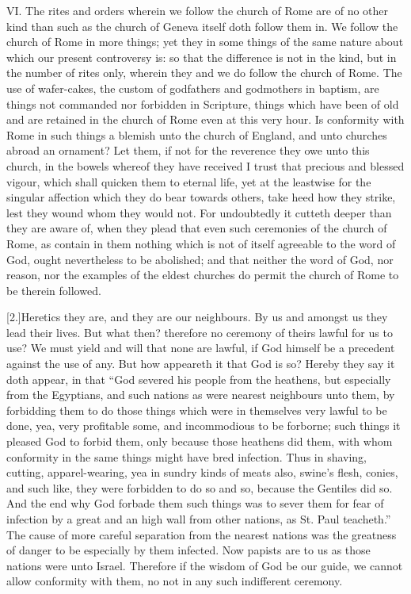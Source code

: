 VI. The rites and orders wherein we follow the church of Rome are of no other kind than such as the church of Geneva itself doth follow them in. We follow the church of Rome in more things; yet they in some things of the same nature about which our present controversy is: so that the difference is not in the kind, but in the number of rites only, wherein they and we do follow the church of Rome. The use of wafer-cakes, the custom of godfathers and godmothers in baptism, are things not commanded nor forbidden in Scripture, things which have been of old and are retained in the church of Rome even at this very hour. Is conformity with Rome in such things a blemish unto the church of England, and unto churches abroad an ornament? Let them, if not for the reverence they owe unto this church, in the bowels whereof they have received I trust that precious and blessed vigour, which shall quicken them to eternal life, yet at the  leastwise for the singular affection which they do bear towards others, take heed how they strike, lest they wound whom they would not. For undoubtedly it cutteth deeper than they are aware of, when they plead that even such ceremonies of the church of Rome, as contain in them nothing which is not of itself agreeable to the word of God, ought nevertheless to be abolished; and that neither the word of God, nor reason, nor the examples of the eldest churches do permit the church of Rome to be therein followed.

[2.]Heretics they are, and they are our neighbours. By us and amongst us they lead their lives. But what then? therefore no ceremony of theirs lawful for us to use? We must yield and will that none are lawful, if God himself be a precedent against the use of any. But how appeareth it that God is so? Hereby they say it doth appear, in that “God severed his people from the heathens, but especially from the Egyptians, and such nations as were nearest neighbours unto them, by forbidding them to do those things which were in themselves very lawful to be done, yea, very profitable some, and incommodious to be forborne; such things it pleased God to forbid them, only because those heathens did them, with whom conformity in the same things might have bred infection. Thus in shaving, cutting, apparel-wearing, yea in sundry kinds of meats also, swine’s flesh, conies, and such like, they were forbidden to do so and so, because the Gentiles did so. And the end why God forbade them such things was to sever them for fear of infection by a great and an high wall from other nations, as St. Paul teacheth.” The cause of more careful separation from the nearest nations was the greatness of danger to be especially by them infected. Now papists are to us as those nations were unto Israel. Therefore if the wisdom of God be our guide, we cannot allow conformity with them, no not in any such indifferent ceremony.

